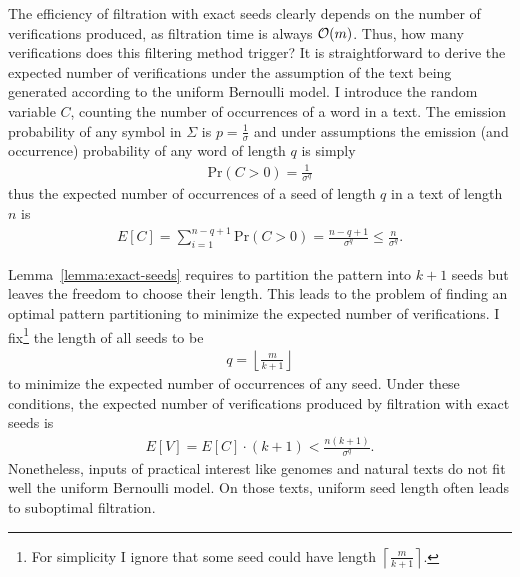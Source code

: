 The efficiency of filtration with exact seeds clearly depends on the number of verifications produced, as filtration time is always $\mathcal{O}(m)$.
Thus, how many verifications does this filtering method trigger?
It is straightforward to derive the expected number of verifications under the assumption of the text being generated according to the uniform Bernoulli model.
I introduce the random variable $C$, counting the number of occurrences of a word in a text.
The emission probability of any symbol in $\Sigma$ is $p = \frac{1}{\sigma}$ and under \iid assumptions the emission (and occurrence) probability of any word of length $q$ is simply
\begin{eqnarray}
\text{Pr}(C > 0) = \frac{1}{\sigma^q}
\end{eqnarray}
thus the expected number of occurrences of a seed of length $q$ in a text of length $n$ is
\begin{eqnarray}
E[C] = \sum_{i=1}^{n-q+1}{\text{Pr}(C > 0)} = \frac{n - q + 1}{\sigma^q} \leq \frac{n}{\sigma^q}.
\end{eqnarray}

Lemma~\ref{lemma:exact-seeds} requires to partition the pattern into $k+1$ seeds but leaves the freedom to choose their length.
This leads to the problem of finding an optimal pattern partitioning to minimize the expected number of verifications.
I fix\footnote{For simplicity I ignore that some seed could have length $\left \lceil \frac{m}{k+1} \right \rceil$.} the length of all seeds to be
\begin{eqnarray}
\label{eq:seed-len}
q=\left \lfloor \frac{m}{k+1} \right \rfloor
\end{eqnarray}
to minimize the expected number of occurrences of any seed.
Under these conditions, the expected number of verifications produced by filtration with exact seeds is
\begin{eqnarray}
E[V] = E[C] \cdot (k + 1) < \frac{n (k + 1)}{\sigma^q}.
\end{eqnarray}
Nonetheless, inputs of practical interest like genomes and natural texts do not fit well the uniform Bernoulli model.
On those texts, uniform seed length often leads to suboptimal filtration.

